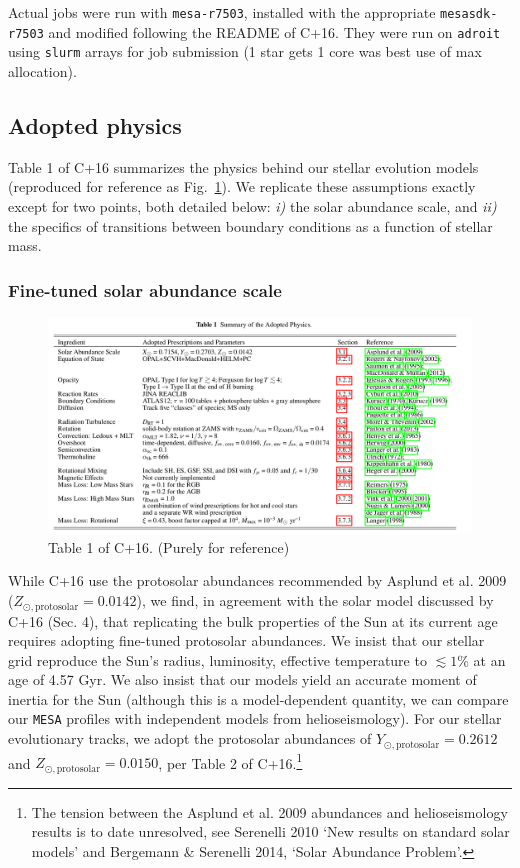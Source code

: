 \documentclass{article}
\begin{document}
Actual jobs were run with \texttt{mesa-r7503}, installed with the appropriate 
\texttt{mesasdk-r7503} and modified following the README of C+16. They were run 
on \texttt{adroit} using \texttt{slurm} arrays for job submission (1 star gets 
1 core was best use of max allocation).

\subsection{Adopted physics}
Table 1 of C+16 summarizes the physics behind our stellar evolution models 
(reproduced for reference as Fig.~\ref{fig:table1_C16}).
We replicate these assumptions exactly except for two points, both detailed 
below: \textit{i)} the solar abundance scale, and \textit{ii)} the specifics of 
transitions between boundary conditions as a function of stellar mass.


\subsubsection{Fine-tuned solar abundance scale}
\begin{figure}[t]
	\centering
	\includegraphics[width=\textwidth]{figs/Choi2016_MIST_table_1.png}
	\caption{Table 1 of C+16. (Purely for reference)}
	\label{fig:table1_C16}
\end{figure}

While C+16 use the protosolar abundances recommended by Asplund et al. 2009 
($Z_{\odot,\mathrm{protosolar}} = 0.0142$), we find, in agreement with the 
solar model discussed by C+16 (Sec. 4), that replicating the bulk properties 
of the Sun at its current age requires adopting fine-tuned protosolar 
abundances.
We insist that our stellar grid reproduce the Sun's radius, luminosity, 
effective temperature to $\lesssim 1\%$ at an age of 4.57 Gyr.
We also insist that our models yield an accurate moment of inertia for the Sun 
(although this is a model-dependent quantity, we can compare our \texttt{MESA} 
profiles with independent models from helioseismology).
For our stellar evolutionary tracks, we adopt the protosolar abundances of
$Y_{\odot,\mathrm{protosolar}} = 0.2612$ and $Z_{\odot,\mathrm{protosolar}} = 
0.0150$, per Table 2 of C+16.\footnote{The tension between the Asplund et al. 
2009 abundances and helioseismology results is to date unresolved, see 
Serenelli 2010 `New results on standard solar models' and Bergemann \& 
Serenelli 2014, `Solar Abundance Problem'.}
\end{document}
